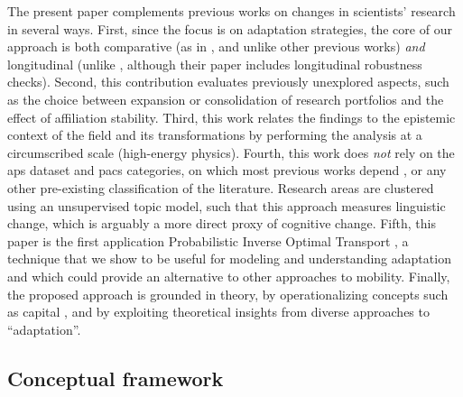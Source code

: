 \documentclass{article}
\begin{document}
The present paper complements previous works on changes in scientists' research in several ways. First, since the focus is on adaptation strategies, the core of our approach is both comparative (as in \citealt{Tripodi2020}, and unlike other previous works) \textit{and} longitudinal (unlike \citealt{Tripodi2020}, although their paper includes longitudinal robustness checks). Second, this contribution evaluates previously unexplored aspects, such as the choice between expansion or consolidation of research portfolios and the effect of affiliation stability. %
Third, this work relates the findings to the epistemic context of the field and its transformations by performing the analysis at a circumscribed scale (high-energy physics). Fourth, this work does \textit{not} rely on the \gls{aps} dataset and \gls{pacs} categories, on which most previous works depend \citep{Jia2017,Aleta2019,Battiston2019,Tripodi2020}, or any other pre-existing classification of the literature. Research areas are clustered using an unsupervised topic model, such that this approach measures linguistic change, which is arguably a more direct proxy of cognitive change. Fifth, this paper is the first application Probabilistic Inverse Optimal Transport \citep{pmlr-v162-chiu22b}, a technique that we show to be useful for modeling and understanding adaptation and which could provide an alternative to other approaches to mobility. Finally, the proposed approach is grounded in theory, by operationalizing concepts such as capital \citep{Bourdieu1980,Bourdieu1986}, and by exploiting theoretical insights from diverse approaches to ``adaptation''.

\subsection{\label{sec:conceptual}Conceptual framework}
\end{document}
